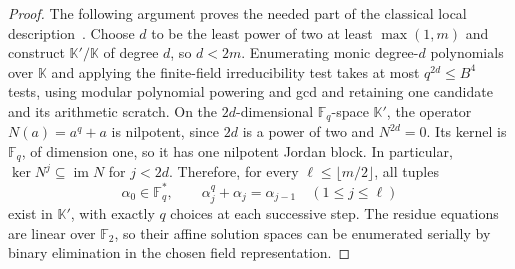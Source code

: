 \documentclass[11pt,letterpaper]{article}
\numberwithin{equation}{section}
\begin{document}
\begin{proof}
The following argument proves the needed part of the classical local description~\cite[Theorem~1]{AleshnikovKumarShumStichtenoth2001Splitting}.
Choose $d$ to be the least power of two at least $\max(1,m)$ and construct $\mathbb K'/\mathbb K$ of degree $d$, so $d<2m$.
Enumerating monic degree-$d$ polynomials over $\mathbb K$ and applying the finite-field irreducibility test takes at most $q^{2d}\leq B^4$ tests, using modular polynomial powering and gcd and retaining one candidate and its arithmetic scratch.
On the $2d$-dimensional $\mathbb F_q$-space $\mathbb K'$, the operator $N(a)=a^q+a$ is nilpotent, since $2d$ is a power of two and $N^{2d}=0$.
Its kernel is $\mathbb F_q$, of dimension one, so it has one nilpotent Jordan block.
In particular, $\ker N^j\subseteq\operatorname{im}N$ for $j<2d$.
Therefore, for every $\ell\leq\lfloor m/2\rfloor$, all tuples
\begin{equation}
 \alpha_0\in\mathbb F_q^*,\qquad
 \alpha_j^q+\alpha_j=\alpha_{j-1}\quad(1\leq j\leq\ell)
 \label{eq:binary-rr-residue-tuple}
\end{equation}
exist in $\mathbb K'$, with exactly $q$ choices at each successive step.
The residue equations are linear over $\mathbb F_2$, so their affine solution spaces can be enumerated serially by binary elimination in the chosen field representation.


\end{proof}
\end{document}
